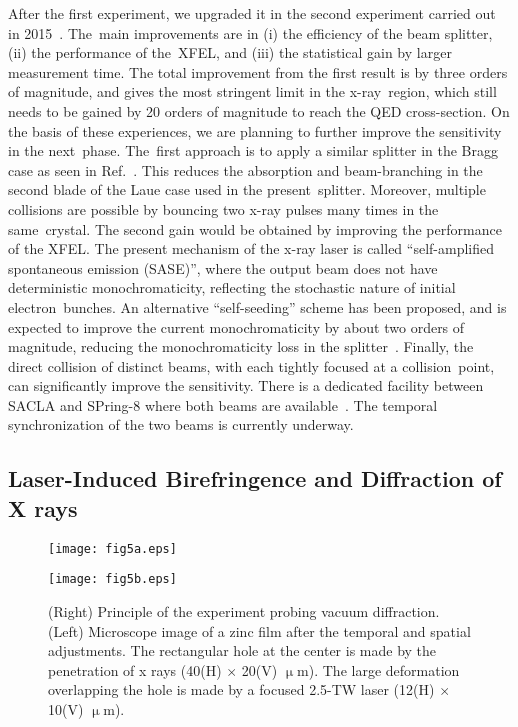 \documentclass[10pt,a4paper]{article}%
\begin{document}
After the first experiment, we upgraded it in the second experiment carried out in 2015~\cite{gg2}.
The~main improvements are in (i) the efficiency of the beam splitter, (ii) the performance of the~XFEL, and (iii) the statistical gain by larger measurement time.
The total improvement from the first result is by three orders of magnitude, and gives the most stringent limit in the x-ray~region, which still needs to be gained by 20 orders of magnitude to reach the QED cross-section.
On the basis of these experiences, we are planning to further improve the sensitivity in the next~phase.
The~first approach is to apply a similar splitter in the Bragg case as seen in Ref.~\cite{bonse3}.
This reduces the absorption and beam-branching in the second blade of the Laue case used in the present~splitter.
Moreover, multiple collisions are possible by bouncing two x-ray pulses many times in the same~crystal.
The second gain would be obtained by improving the performance of the XFEL.
The present mechanism of the x-ray laser is called ``self-amplified spontaneous emission (SASE)'', where the output beam does not have deterministic monochromaticity, reflecting the stochastic nature of initial electron~bunches.
An alternative ``self-seeding'' scheme has been proposed, and is expected to improve the current monochromaticity by about two orders of magnitude, reducing the monochromaticity loss in the splitter~\cite{seed}.
Finally, the direct collision of distinct beams, with each tightly focused at a collision~point, can significantly improve the sensitivity.
There is a dedicated facility between SACLA and SPring-8 where both beams are available~\cite{double}.
The temporal synchronization of the two beams is currently underway.

\subsection{Laser-Induced Birefringence and Diffraction of X rays}\label{subsec:vd}

\begin{figure}[t]
\begin{minipage}{0.5\hsize}
\centering
\texttt{[image: fig5a.eps]}
\end{minipage}
\begin{minipage}{0.5\hsize}
\centering
\texttt{[image: fig5b.eps]}
\end{minipage}
\caption{
(Right)
Principle of the experiment probing vacuum diffraction.
(Left)
Microscope image of a zinc film after the temporal and spatial adjustments.
The rectangular hole at the center is made by the penetration of x rays (40(H) $\times$ 20(V) $\upmu$m).
The large deformation overlapping the hole is made by a focused 2.5-TW laser (12(H) $\times$ 10(V) $\upmu$m).
\label{fig:vd}}
\end{figure}   
\end{document}
